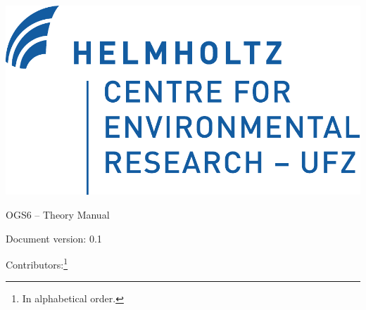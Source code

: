 \begin{titlepage}

\begin{flushright}
\includegraphics[height=0.1\textheight]{UFZ_logo}
\end{flushright}


\vspace{20mm}

\begin{center}
{\huge{OGS6 -- Theory Manual}}

\vfill
{\large{Document version: 0.1}}
\end{center}

\vspace{20mm}
{\large{Contributors:}}\footnote{In alphabetical order.}

{\large{
\@author}}

\end{titlepage}
